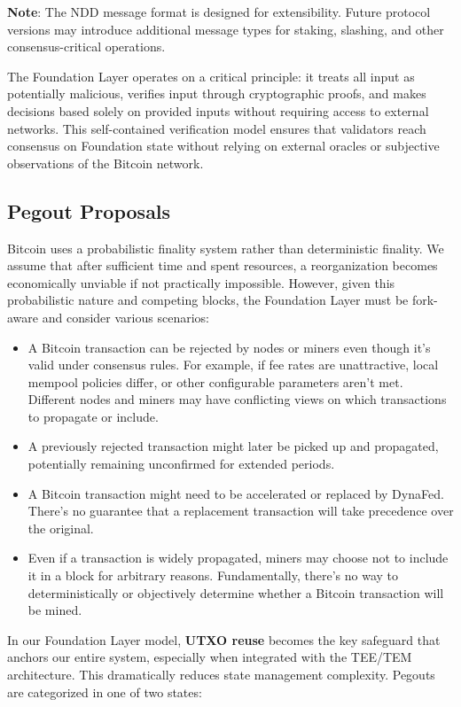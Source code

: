 \textbf{Note}: The NDD message format is designed for extensibility. Future protocol versions may introduce additional message types for staking, slashing, and other consensus-critical operations.

The Foundation Layer operates on a critical principle: it treats all input as potentially malicious, verifies input through cryptographic proofs, and makes decisions based solely on provided inputs without requiring access to external networks. This self-contained verification model ensures that validators reach consensus on Foundation state without relying on external oracles or subjective observations of the Bitcoin network.

\subsection{Pegout Proposals}
\label{sec:pegout-proposals}

Bitcoin uses a probabilistic finality system rather than deterministic finality. We assume that after sufficient time and spent resources, a reorganization becomes economically unviable if not practically impossible. However, given this probabilistic nature and competing blocks, the Foundation Layer must be fork-aware and consider various scenarios:

\begin{itemize}
    \item A Bitcoin transaction can be rejected by nodes or miners even though it's valid under consensus rules. For example, if fee rates are unattractive, local mempool policies differ, or other configurable parameters aren't met. Different nodes and miners may have conflicting views on which transactions to propagate or include.
    \item A previously rejected transaction might later be picked up and propagated, potentially remaining unconfirmed for extended periods.
    \item A Bitcoin transaction might need to be accelerated or replaced by DynaFed. There's no guarantee that a replacement transaction will take precedence over the original.
    \item Even if a transaction is widely propagated, miners may choose not to include it in a block for arbitrary reasons. Fundamentally, there's no way to deterministically or objectively determine whether a Bitcoin transaction will be mined.
\end{itemize}

In our Foundation Layer model, \textbf{UTXO reuse} becomes the key safeguard that anchors our entire system, especially when integrated with the TEE/TEM architecture. This dramatically reduces state management complexity. Pegouts are categorized in one of two states:

